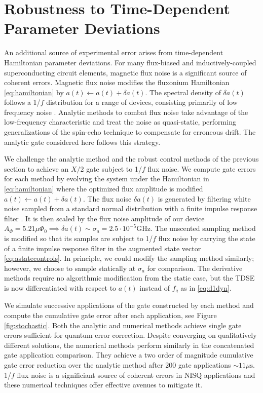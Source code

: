 \section{Robustness to Time-Dependent Parameter Deviations \label{sec:stochastic}}
An additional source of experimental error arises from time-dependent
Hamiltonian parameter deviations. For many flux-biased and inductively-coupled
superconducting circuit elements, magnetic flux noise is a significant
source of coherent errors. Magnetic flux noise
modifies the fluxonium Hamiltonian \eqref{eq:hamiltonian}
by $a(t) \gets a(t) + \delta a(t)$.
The spectral density of $\delta a(t)$ follows a
1/$f$ distribution for a range of devices, consisting primarily of low frequency
noise \cite{bialczak20071f, koch2007model,
  yoshihara2006decoherence, yoshihara2010correlated}.
Analytic methods to combat flux noise
take advantage of the low-frequency characteristic and
treat the noise as quasi-static, performing generalizations of the spin-echo technique
to compensate for erroneous drift. The analytic gate considered here
follows this strategy.

We challenge the analytic method and
the robust control
methods of the previous section
to achieve an $X/2$ gate subject to 1/$f$ flux noise.
We compute gate errors for each method
by evolving the system under the Hamiltonian in \eqref{eq:hamiltonian}
where the optimized flux amplitude is modified $a(t) \gets a(t) + \delta a(t)$.
The flux noise $\delta a(t)$ is generated by
filtering white noise sampled from a standard normal distribution with a finite
impulse response filter \cite{saspweb2011}.
It is then scaled by the 
flux noise amplitude of our device $A_{\Phi} = 5.21 \mu \Phi_{0} \implies
\delta a (t) \sim \sigma_{a} = 2.5 \cdot 10^{-5} \textrm{GHz}$.
The unscented sampling method is modified so that its samples
are subject to 1/$f$ flux noise by carrying the state of a finite impulse response filter
in the augmented state vector \eqref{eq:astatecontrols}.
In principle, we could modify the sampling method
similarly; however, we choose to sample statically at $\sigma_{a}$ for comparison.
The derivative methods require no algorithmic modification from the static case,
but the TDSE is now differentiated with respect to $a(t)$ instead of $f_{q}$ as
in \eqref{eq:d1dyn}.

We simulate successive applications of the gate constructed by each method
and compute the cumulative gate error
after each application, see Figure \ref{fig:stochastic}.
Both the analytic
and numerical methods achieve single gate errors
sufficient for quantum error correction.
Despite converging on qualitatively different solutions, the
numerical methods perform similarly in the concatenated
gate application comparison. They achieve a two
order of magnitude cumulative gate error reduction over the analytic method after $200$
gate applications $\sim 11 \mu\textrm{s}$.
1/$f$ flux noise is a significiant source of coherent errors in NISQ applications and
these numerical techniques offer effective avenues to mitigate it.
